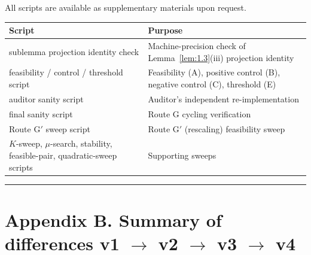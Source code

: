 \documentclass[11pt,a4paper]{article}
\theoremstyle{plain}
\theoremstyle{definition}
\theoremstyle{remark}
\begin{document}
All scripts are available as supplementary materials upon request.

\begin{center}
\begin{tabularx}{\textwidth}{@{}lX@{}}
\toprule
Script & Purpose \\
\midrule
sublemma projection identity check & Machine-precision check of Lemma~\ref{lem:1.3}(iii) projection identity \\
feasibility / control / threshold script & Feasibility (A), positive control (B), negative control (C), threshold (E) \\
auditor sanity script & Auditor's independent re-implementation \\
final sanity script & Route G cycling verification \\
Route G$'$ sweep script & Route G$'$ (rescaling) feasibility sweep \\
$K$-sweep, $\mu$-search, stability, feasible-pair, quadratic-sweep scripts & Supporting sweeps \\
\bottomrule
\end{tabularx}
\end{center}

\bigskip
\hrule
\bigskip

\section*{Appendix B. Summary of differences v1 $\to$ v2 $\to$ v3 $\to$ v4}
\end{document}
